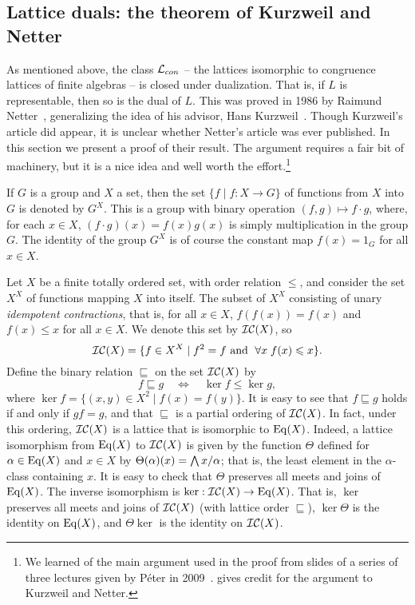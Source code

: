 \subsection{Lattice duals: the theorem of Kurzweil and Netter}
\label{sec:duals-interv-subl-detail}
As mentioned above, 
the class $\mathcal{L}_{con}$ -- the lattices isomorphic to congruence lattices of finite
algebras -- is closed under
dualization.
That is, if $L$ is representable, then so is the dual of $L$. This was proved in
1986 by Raimund Netter~\cite{Netter:1986}, generalizing the idea of his advisor,
Hans Kurzweil~\cite{Kurzweil:1985}. 
Though Kurzweil's article did appear,
it is unclear whether Netter's
article was ever published.
In this section we present a proof of their result.
The argument requires a fair bit of machinery, but it is a nice idea and
well worth the effort.\footnote{We learned 
  of the main argument used in the proof from slides of a series of three
  lectures given by P{\'e}ter \Palfy in 2009~\cite{Palfy:2009}.
  \Palfy gives credit for the argument to Kurzweil and Netter.} 

If $G$ is a group and $X$ a set, then the set $\{f \mid f:X\rightarrow G\}$ of 
functions from $X$ into $G$ is denoted by $G^X$.  This is a group with binary
operation $(f,g) \mapsto f\cdot g$, where,  
for each $x\in X$, $(f\cdot g)(x)= f(x)g(x)$ is simply multiplication
in the group $G$.  The identity of the group $G^X$ is of course the constant map $f(x) =
1_G$ for all $x\in X$.

Let $X$ be a finite totally ordered set, with order relation $\leq$,
and consider the set $X^X$ of functions mapping $X$ into itself.  
The subset of $X^X$ consisting of unary
\emph{idempotent contractions}, that is, for all $x\in X$,
$f(f(x)) = f(x)$ and $f(x) \leq x$ for all $x\in X$. 
We denote this set by $\mathcal{IC}(X)$, so
\[
\mathcal{IC}(X) = \{f\in X^X \mid f^2 = f \text{ and }\; \forall x\; f(x) \leqslant x\}.
\]
Define the binary relation $\sqsubseteq$ on the set $\mathcal{IC}(X)$ by
\begin{equation}
  \label{eq:MID111}
   f\sqsubseteq g \quad \Leftrightarrow \quad \ker f \leq \ker g,
\end{equation}
where $\ker f = \{(x,y) \in X^2 \mid f(x) = f(y)\}$.
It is easy to see that $f\sqsubseteq g$ holds if and only if $gf = g$, and that
$\sqsubseteq$ is a partial ordering of $\mathcal{IC}(X)$.  
In fact, under this ordering, $\mathcal{IC}(X)$ is a lattice that is
isomorphic to $\operatorname{Eq}(X)$. Indeed, a lattice isomorphism from $\operatorname{Eq}(X)$ to $\mathcal{IC}(X)$
is given by the function $\Theta$ defined for $\alpha\in \operatorname{Eq}(X)$ and
$x\in X$ by $\Theta(\alpha)(x) = \bigwedge x/\alpha$; that is,
the least element in the $\alpha$-class containing $x$.
It is easy to check that $\Theta$ preserves all meets and joins of
$\operatorname{Eq}(X)$. The inverse isomorphism is $\ker: \mathcal{IC}(X) \to \operatorname{Eq}(X)$.
That is, $\ker$ preserves all meets and joins of $\mathcal{IC}(X)$ (with lattice order
$\sqsubseteq$), $\ker \Theta$ is the identity on $\operatorname{Eq}(X)$, and $\Theta \ker$
is the identity on $\mathcal{IC}(X)$.

